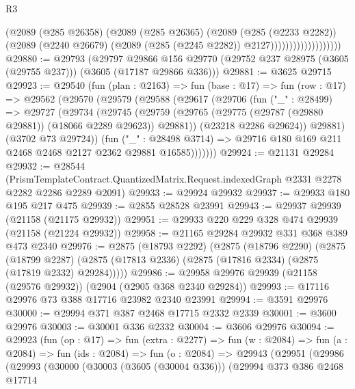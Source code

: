 \begin{lexlean}{R3}
\begin{coremodule}
                                (@2089
                                  (@285 @26358)
                                  (@2089
                                    (@285 @26365)
                                    (@2089
                                      (@285 (@2233 @2282))
                                      (@2089
                                        (@2240 @26679)
                                        (@2089 (@285 (@2245 @2282)) @2127)))))))))))))))))))
@29880 := @29793
    (@29797
      @29866
      @156
      @29770
      (@29752 @237 @28975 (@3605 (@29755 @237)))
      (@3605 (@17187 @29866 @336)))
@29881 := @3625 @29715
@29923 := @29540
    (fun (plan : @2163) =>
    fun (base : @17) =>
    fun (row : @17) =>
    @29562
      (@29570
        (@29579
          (@29588
            (@29617
              (@29706
                (fun ("_" : @28499) =>
                @29727
                  (@29734
                    (@29745
                      (@29759
                        (@29765 (@29775 (@29787 (@29880 @29881)) (@18066 @2289 @29623)) @29881))
                      (@23218 @2286 @29624))
                    @29881)
                  (@3702 @73 @29724))
                (fun ("_" : @28498 @3714) =>
                @29716 @180 @169 @211 @2468 @2468 @2127 @2362 @29881 @16585)))))))
@29924 := @21131 @29284
@29932 := @28544
    (PrismTemplateContract.QuantizedMatrix.Request.indexedGraph @2331 @2278 @2282 @2286 @2289 @2091)
@29933 := @29924 @29932
@29937 := @29933 @180 @195 @217 @475
@29939 := @2855 @28528 @23991
@29943 := @29937 @29939 (@21158 (@21175 @29932))
@29951 := @29933 @220 @229 @328 @474 @29939 (@21158 (@21224 @29932))
@29958 := @21165 @29284 @29932 @331 @368 @389 @473 @2340
@29976 := @2875
    (@18793 @2292)
    (@2875
      (@18796 @2290)
      (@2875
        (@18799 @2287)
        (@2875 (@17813 @2336) (@2875 (@17816 @2334) (@2875 (@17819 @2332) @29284)))))
@29986 := @29958 @29976 @29939 (@21158 (@29576 @29932)) (@2904 (@2905 @368 @2340 @29284))
@29993 := @17116 @29976 @73 @388 @17716 @23982 @2340 @23991
@29994 := @3591 @29976
@30000 := @29994 @371 @387 @2468 @17715 @2332 @2339
@30001 := @3600 @29976
@30003 := @30001 @336 @2332
@30004 := @3606 @29976
@30094 := @29923
    (fun (op : @17) =>
    fun (extra : @2277) =>
    fun (w : @2084) =>
    fun (a : @2084) =>
    fun (ids : @2084) =>
    fun (o : @2084) =>
    @29943
      (@29951
        (@29986
          (@29993
            (@30000
              (@30003 (@3605 (@30004 @336)))
              (@29994
                @373
                @386
                @2468
                @17714

\end{coremodule}
\end{lexlean}
